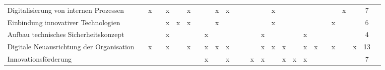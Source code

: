 \begin{sidewaystable}[ht]
\begin{tabular}{|p{6cm}|c|c|c|c|c|c|c|c|c|c|c|c|c|c|c|c|c|c|c|c|c|c|c|c|c|}
		Digitalisierung von internen Prozessen              &                   & x                  &                    & x                    &                    & x                 &                   &                      & x                  & x                    &                  &                  &                     &                  & x               &                      &                    &                 &                  &                  &                        & x                    &                        & 7  \\
		Einbindung innovativer Technologien                 &                   &                    &                    & x                    & x                  & x                 &                   &                      & x                  &                      &                  &                  &                     &                  & x               &                      &                    &                 &                  &                  & x                      &                      &                        & 6  \\
		Aufbau technisches Sicherheitskonzept      &                   &                    &                    & x                    &                    &                   &                   & x                    &                    &                      &                  &                  &                     & x                &                 &                      &                    & x               &                  &                  &                        &                      &                        & 4  \\
		Digitale Neuausrichtung der Organisation            &                   & x                  &                    & x                    &                    & x                 &                   & x                    & x                  & x                    &                  &                  &                     & x                & x               & x                    &                    & x               & x                &                  & x                      &                      & x                      & 13 \\
		Innovationsförderung                                &                   &                    &                    &                      &                    &                   &                   & x                    &                    & x                    &                  &                  & x                   & x                &                 & x                    & x                  & x               &                  &                  &                        &                      &                        & 7  \\

\end{tabular}
\end{sidewaystable}
